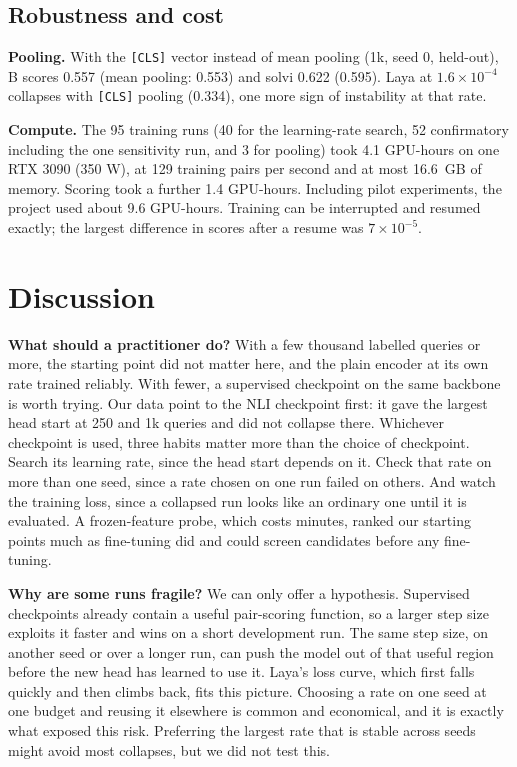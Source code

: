\documentclass[journal]{IEEEtran}
\begin{document}
\subsection{Robustness and cost}

\textbf{Pooling.} With the \texttt{[CLS]} vector instead of mean pooling (1k, seed 0, held-out), B scores 0.557 (mean pooling: 0.553) and solvi 0.622 (0.595). Laya at $1.6\times10^{-4}$ collapses with \texttt{[CLS]} pooling (0.334), one more sign of instability at that rate.

\textbf{Compute.} The 95 training runs (40 for the learning-rate search, 52 confirmatory including the one sensitivity run, and 3 for pooling) took 4.1 GPU-hours on one RTX 3090 (350 W), at 129 training pairs per second and at most 16.6~GB of memory. Scoring took a further 1.4 GPU-hours. Including pilot experiments, the project used about 9.6 GPU-hours. Training can be interrupted and resumed exactly; the largest difference in scores after a resume was $7\times10^{-5}$.

\section{Discussion}

\textbf{What should a practitioner do?} With a few thousand labelled queries or more, the starting point did not matter here, and the plain encoder at its own rate trained reliably. With fewer, a supervised checkpoint on the same backbone is worth trying. Our data point to the NLI checkpoint first: it gave the largest head start at 250 and 1k queries and did not collapse there. Whichever checkpoint is used, three habits matter more than the choice of checkpoint. Search its learning rate, since the head start depends on it. Check that rate on more than one seed, since a rate chosen on one run failed on others. And watch the training loss, since a collapsed run looks like an ordinary one until it is evaluated. A frozen-feature probe, which costs minutes, ranked our starting points much as fine-tuning did and could screen candidates before any fine-tuning.

\textbf{Why are some runs fragile?} We can only offer a hypothesis. Supervised checkpoints already contain a useful pair-scoring function, so a larger step size exploits it faster and wins on a short development run. The same step size, on another seed or over a longer run, can push the model out of that useful region before the new head has learned to use it. Laya's loss curve, which first falls quickly and then climbs back, fits this picture. Choosing a rate on one seed at one budget and reusing it elsewhere is common and economical, and it is exactly what exposed this risk. Preferring the largest rate that is stable across seeds might avoid most collapses, but we did not test this.
\end{document}
